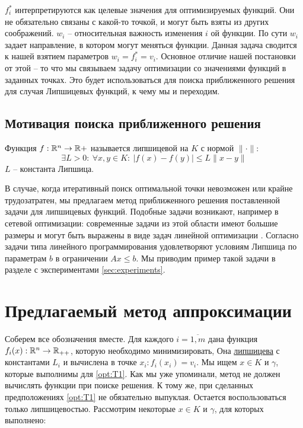 $f_i^*$ интерпретируются как целевые значения для оптимизируемых функций. Они не обязательно связаны с какой-то точкой, и могут быть взяты из других соображений.  $ w_i$ -- относительная важность изменения $i$ ой функции. По сути $w_i$ задает направление, в котором могут меняться функции. Данная задача сводится к нашей взятием параметров $w_i= f_i^* = v_i$.  Основное отличие нашей постановки от этой -- то что мы связываем задачу оптимизации со значениями функций в заданных точках. Это будет использоваться для поиска приближенного решения для случая Липшицевых функций, к чему мы и переходим.

\subsection{Мотивация поиска приближенного решения}
\begin{definition} \label{def:lipschitz_function}
    Функция $f : {\mathbb R}^n \rightarrow {\mathbb R}+$ называется липшицевой на $K$ с нормой $\|\cdot\|$:  
    $$
    \exists L > 0: ~ \forall x, y \in K:~  |f(x) - f(y) | \le L \|x -y\|
    $$
    $L$ -- константа Липшица.
\end{definition}

В случае, когда итеративный поиск оптимальной точки невозможен или крайне трудозатратен, мы предлагаем метод приближенного решения поставленной задачи для липшицевых функций.  Подобные задачи возникают, например в сетевой оптимизации: современные задачи из этой области имеют большие размеры и могут быть выражены в виде задач линейной оптимизации \cite{banos1995linear, martin2012large}. Согласно \cite{mangasarian1987lipschitz} задачи типа линейного программирования удовлетворяют условиям Липшица по параметрам $b$ в ограничении $Ax \leq b$. Мы приводим пример такой задачи в разделе с экспериментами \ref{sec:experiments}.

\section{Предлагаемый метод аппроксимации}\label{sec:method}
Соберем все обозначения вместе. Для каждого $i = \overline{1, m}$ дана функция $f_i(x):{\mathbb R}^n \rightarrow{\mathbb R}_{++}$, которую 
необходимо минимизировать, Она \hyperref[def:lipschitz_function]{липшицева} с константами $L_i$ и вычислена в точке $x_i:f_i(x_i) = v_i$. Мы ищем $x \in K$ и $\gamma$, которые выполнимы для \ref{opt:T1}. Как мы уже упоминали, метод не должен вычислять функции при поиске решения. К тому же, при сделанных предположениях \ref{opt:T1} не обязательно выпуклая. Остается воспользоваться только липшицевостью. Рассмотрим некоторые $x\in K$ и $\gamma$, для которых выполнено:

